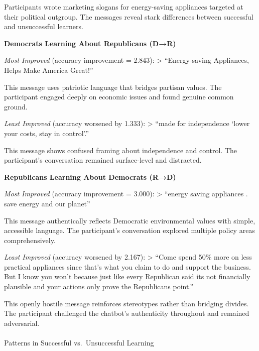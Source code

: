 \documentclass[
  11pt,
  oneside]{article}
\makeatletter
\let\oldparagraph\paragraph
\renewcommand{\paragraph}{
    \@ifstar
      \xxxParagraphStar
      \xxxParagraphNoStar
  }
\newcommand{\xxxParagraphStar}[1]{\oldparagraph*{#1}\mbox{}}
\newcommand{\xxxParagraphNoStar}[1]{\oldparagraph{#1}\mbox{}}
\makeatother
\begin{document}
Participants wrote marketing slogans for energy-saving appliances
targeted at their political outgroup. The messages reveal stark
differences between successful and unsuccessful learners.

\textbf{Democrats Learning About Republicans (D→R)}

\emph{Most Improved} (accuracy improvement = 2.843): \textgreater{}
``Energy-saving Appliances, Helps Make America Great!''

This message uses patriotic language that bridges partisan values. The
participant engaged deeply on economic issues and found genuine common
ground.

\emph{Least Improved} (accuracy worsened by 1.333): \textgreater{}
``made for independence `lower your costs, stay in control'.''

This message shows confused framing about independence and control. The
participant's conversation remained surface-level and distracted.

\textbf{Republicans Learning About Democrats (R→D)}

\emph{Most Improved} (accuracy improvement = 3.000): \textgreater{}
``energy saving appliances . save energy and our planet''

This message authentically reflects Democratic environmental values with
simple, accessible language. The participant's conversation explored
multiple policy areas comprehensively.

\emph{Least Improved} (accuracy worsened by 2.167): \textgreater{}
``Come spend 50\% more on less practical appliances since that's what
you claim to do and support the business. But I know you won't because
just like every Republican said its not financially plausible and your
actions only prove the Republicans point.''

This openly hostile message reinforces stereotypes rather than bridging
divides. The participant challenged the chatbot's authenticity
throughout and remained adversarial.

\paragraph{Patterns in Successful vs.~Unsuccessful
Learning}\label{patterns-in-successful-vs.-unsuccessful-learning}
\end{document}
